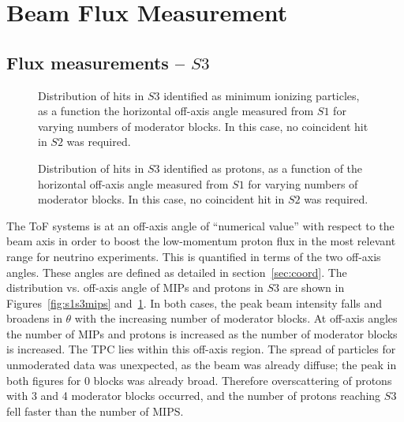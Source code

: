 \section{Beam Flux Measurement}
\label{hptpcPaper:sec:Results}

\subsection{Flux measurements -- $\mathit{S3}$}

\begin{figure}[h]
  \begin{minipage}{0.48\textwidth}
    \begin{adjustbox}{max totalsize={\textwidth}{.35\textheight},center}
      
    \end{adjustbox}
    \caption{Distribution of hits in $\mathit{S3}$ identified as minimum ionizing particles, as a function the horizontal off-axis angle measured from $\mathit{S1}$ for varying numbers of moderator blocks. In this case, no coincident hit in $\mathit{S2}$ was required.}
    \label{fig:s1s3mips}
  \end{minipage}
  \hspace{0.3cm}
  \begin{minipage}{0.48\textwidth}
    \begin{adjustbox}{max totalsize={\textwidth}{.35\textheight},center}
      
    \end{adjustbox}
    \caption{Distribution of hits in $\mathit{S3}$ identified as protons, as a function of the horizontal off-axis angle measured from $\mathit{S1}$ for varying numbers of moderator blocks. In this case, no coincident hit in $\mathit{S2}$ was required.}
    \label{fig:s1s3protons}
  \end{minipage}
\end{figure}

The ToF systems is at an off-axis angle of ``numerical value'' with respect to the beam axis in order to boost the low-momentum proton flux in the most relevant range for neutrino experiments.
This is quantified in terms of the two off-axis angles.
These angles are defined as detailed in section~\ref{sec:coord}.
The distribution vs. off-axis angle of MIPs and protons in $\mathit{S3}$ are shown in Figures~\ref{fig:s1s3mips} and~\ref{fig:s1s3protons}.
In both cases, the peak beam intensity falls and broadens in $\theta$ with the increasing number of moderator blocks. 
At off-axis angles the number of MIPs and protons is increased as the number of moderator blocks is increased.
The TPC lies within this off-axis region.
The spread of particles for unmoderated data was unexpected, as the beam was already diffuse; the peak in both figures for 0 blocks was already broad.
Therefore overscattering of protons with 3 and 4 moderator blocks occurred, and the number of protons reaching $\mathit{S3}$ fell faster than the number of MIPS.

